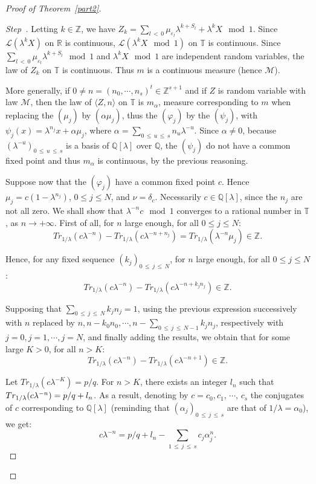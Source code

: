 \documentclass[AHL,Unicode,longabstracts,published]{cedram}
\newcommand{\Tbb}{\mathbb T}
\newcommand{\Rbb}{\mathbb R}
\newcommand{\Qbb}{\mathbb Q}
\newcommand{\Zbb}{\mathbb Z}
\newcommand{\Lcl}{\mathcal{L}}
\newcommand{\Mcl}{\mathcal{M}}
\newcounter{stepcount}
\newenvironment{step}{\refstepcounter{stepcount}\begin{proof}[Step~\thestepcount]}{\let\qed\relax\end{proof}}
\begin{document}
\begin{proof}[{Proof of Theorem~\ref{part2}}]
\begin{step}
Letting $k\in\Zbb$, we have $Z_k=\sum_{l\,<\,0}\mu_{\varepsilon_l}\lambda^{k+S_l}+\lambda^{k}X\mod 1$. Since ${\Lcl}(\lambda^kX)$ on $\Rbb$ is continuous, ${\Lcl}(\lambda^kX\mod 1)$ on $\Tbb$ is continuous. Since $\sum_{l\,<\,0}\mu_{\varepsilon_l}\lambda^{k+S_l}\mod1$ and $\lambda^{k}X\mod 1$ are independent random variables, the law of $Z_k$ on $\Tbb$ is continuous. Thus $m$ is a continuous measure (hence $\Mcl$).

More generally, if $0\not=n=(n_0,\cdots,n_s)^t\in\Zbb^{s+1}$ and if $Z$ is random variable with law $\Mcl$, then the law of $\langle Z,n\rangle$ on $\Tbb$ is $m_{\alpha}$, measure corresponding to $m$ when replacing the $(\mu_j)$ by $(\alpha\mu_j)$, thus the $(\varphi_j)$ by the $(\psi_j)$, with $\psi_j(x)=\lambda^{n_j}x+\alpha\mu_j$, where $\alpha=\sum_{0\,\leq\,u\,\leq\,s}n_u\lambda^{-u}$. Since $\alpha\not=0$, because $(\lambda^{-u})_{0\,\leq\,u\,\leq\,s}$ is a basis of $\Qbb[\lambda]$ over $\Qbb$, the $(\psi_j)$ do not have a common fixed point and thus $m_{\alpha}$ is continuous, by the previous reasoning.

Suppose now that the $(\varphi_j)$ have a common fixed point $c$. Hence $\mu_j=c(1-\lambda^{n_j})$, $0\leq j\leq N$, and $\nu=\delta_c$. Necessarily $c\in\Qbb[\lambda]$, since the $n_j$ are not all zero. We shall show that $\lambda^{-n}c\mod 1$ converges to a rational number in $\Tbb$, as $n\rightarrow+\infty$. First of all, for $n$ large enough, for all $0\leq j\leq N$:
\[
Tr_{1/\lambda}\left(c\lambda^{-n}\right)-Tr_{1/\lambda}\left(c\lambda^{-n+n_j}\right)=Tr_{1/\lambda}\left(\lambda^{-n}\mu_j\right)\in\Zbb.
\]

Hence, for any fixed sequence $(k_j)_{0\,\leq\,j\,\leq\,N}$, for $n$ large enough, for all $0\leq j\leq N$:
\[
Tr_{1/\lambda}\left(c\lambda^{-n}\right)-Tr_{1/\lambda}\left(c\lambda^{-n+k_jn_j}\right)\in\Zbb.
\]

Supposing that $\sum_{0\,\leq\,j\,\leq\,N}k_jn_j=1$, using the previous expression successively with $n$ replaced by $n,n-k_0n_0,\cdots,n-\sum_{0\,\leq\,j\,\leq\,N-1}k_jn_j$, respectively with $j=0,j=1,\cdots,j=N$, and finally adding the results, we obtain that for some large $K>0$, for all $n>K$:
\[
Tr_{1/\lambda}\left(c\lambda^{-n}\right)-Tr_{1/\lambda}\left(c\lambda^{-n+1}\right)\in\Zbb.
\]

Let $Tr_{1/\lambda}(c\lambda^{-K})=p/q$. For $n>K$, there exists an integer $l_n$ such that $Tr_{1/\lambda}(c\lambda^{-n})\linebreak=p/q+l_n$. As a result, denoting by $c=c_0,c_1,\,\cdots,\,c_s$ the conjugates of $c$ corresponding to $\Qbb[\lambda]$ (reminding that $(\alpha_j)_{0\,\leq\,j\,\leq\,s}$ are that of $1/\lambda=\alpha_0$), we get:
\[
c\lambda^{-n}=p/q+l_n-\sum_{1\,\leq\,j\,\leq\,s}c_j\alpha_j^n.
\]


\end{step}
\end{proof}
\end{document}
